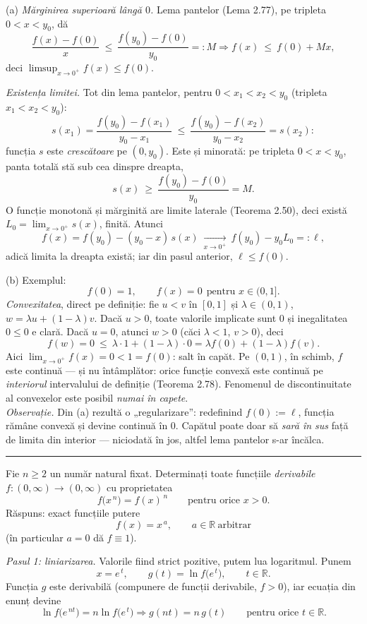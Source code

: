 (a) \emph{Mărginirea superioară lângă $0$.} Lema pantelor (Lema 2.77), pe tripleta $0<x<y_{0}$, dă
\[ \frac{f(x)-f(0)}{x}\ \le\ \frac{f(y_{0})-f(0)}{y_{0}}=:M \Longrightarrow f(x)\ \le\ f(0)+Mx , \]
deci $\limsup_{x\to0^{+}}f(x)\le f(0)$.

\emph{Existența limitei.} Tot din lema pantelor, pentru $0<x_{1}<x_{2}<y_{0}$ (tripleta $x_{1}<x_{2}<y_{0}$):
\[ s(x_{1})=\frac{f(y_{0})-f(x_{1})}{y_{0}-x_{1}}\ \le\ \frac{f(y_{0})-f(x_{2})}{y_{0}-x_{2}}=s(x_{2}) : \]
funcția $s$ este \emph{crescătoare} pe $(0,y_{0})$. Este și minorată: pe tripleta $0<x<y_{0}$, panta totală stă sub cea dinspre dreapta,
\[ s(x)\ \ge\ \frac{f(y_{0})-f(0)}{y_{0}}=M . \]
O funcție monotonă și mărginită are limite laterale (Teorema 2.50), deci există $L_{0}=\lim_{x\to0^{+}}s(x)$, finită. Atunci
\[ f(x)=f(y_{0})-(y_{0}-x)\,s(x)\ \xrightarrow[x\to0^{+}]{}\ f(y_{0})-y_{0}L_{0}=:\ell , \]
adică limita la dreapta există; iar din pasul anterior, $\ell\le f(0)$.

(b) Exemplul:
\[ f(0)=1,\qquad f(x)=0\ \ \text{pentru }x\in(0,1] . \]
\emph{Convexitatea}, direct pe definiție: fie $u<v$ în $[0,1]$ și $\lambda\in(0,1)$, $w=\lambda u+(1-\lambda)v$. Dacă $u>0$, toate valorile implicate sunt $0$ și inegalitatea $0\le0$ e clară. Dacă $u=0$, atunci $w>0$ (căci $\lambda<1$, $v>0$), deci
\[ f(w)=0\ \le\ \lambda\cdot1+(1-\lambda)\cdot0=\lambda f(0)+(1-\lambda)f(v) . \]
Aici $\lim_{x\to0^{+}}f(x)=0<1=f(0)$: salt în capăt. Pe $(0,1)$, în schimb, $f$ este continuă --- și nu întâmplător: orice funcție convexă este continuă pe \emph{interiorul} intervalului de definiție (Teorema 2.78). Fenomenul de discontinuitate al convexelor este posibil \emph{numai în capete}.\\[2pt]
\emph{Observație.} Din (a) rezultă o „regularizare'': redefinind $f(0):=\ell$, funcția rămâne convexă și devine continuă în $0$. Capătul poate doar să \emph{sară în sus} față de limita din interior --- niciodată în jos, altfel lema pantelor s-ar încălca.
\vspace{1mm}\hrule

Fie $n\ge2$ un număr natural fixat. Determinați toate funcțiile \emph{derivabile} $f:(0,\infty)\to(0,\infty)$ cu proprietatea
\[ f\bigl(x^{\,n}\bigr)=f(x)^{\,n}\qquad\text{pentru orice }x>0 . \]
\sol Răspuns: exact funcțiile putere
\[ f(x)=x^{\,a},\qquad a\in\mathbb{R}\ \text{arbitrar} \]
(în particular $a=0$ dă $f\equiv1$).

\emph{Pasul 1: liniarizarea.} Valorile fiind strict pozitive, putem lua logaritmul. Punem
\[ x=e^{\,t},\qquad g(t)=\ln f\bigl(e^{\,t}\bigr),\qquad t\in\mathbb{R} . \]
Funcția $g$ este derivabilă (compunere de funcții derivabile, $f>0$), iar ecuația din enunț devine
\[ \ln f\bigl(e^{\,nt}\bigr)=n\ln f\bigl(e^{\,t}\bigr) \Longrightarrow g(nt)=n\,g(t)\qquad\text{pentru orice }t\in\mathbb{R} . \tag{1} \]

